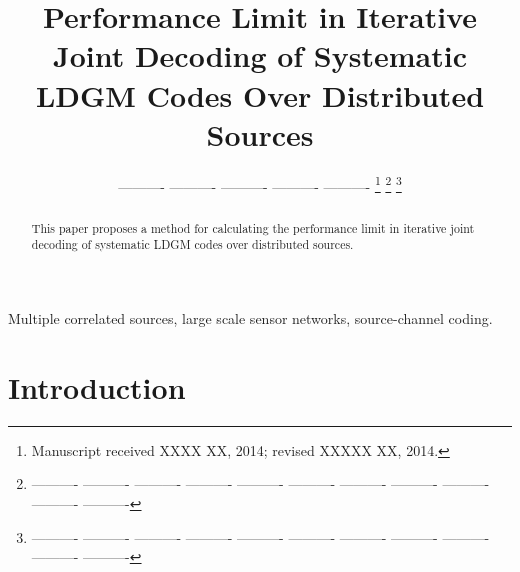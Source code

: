 \documentclass[journal]{IEEEtran}
\begin{document}
\title{Performance  Limit in Iterative Joint Decoding of Systematic LDGM Codes  Over Distributed Sources}




\author{---------- ---------- ---------- ---------- ---------- %
\thanks{Manuscript received XXXX XX, 2014; revised XXXXX XX, 2014.}
\thanks{---------- ---------- ---------- ---------- ---------- ---------- ---------- ---------- ---------- ---------- ---------- }%
\thanks{---------- ---------- ---------- ---------- ---------- ---------- ---------- ---------- ---------- ---------- ---------- }}%


\maketitle


\begin{abstract}
This paper proposes a method for calculating the performance  limit in  iterative 
joint decoding of systematic LDGM codes  over distributed sources.

\end{abstract}

\begin{keywords}
Multiple correlated sources, large scale sensor networks, source-channel coding.
\end{keywords}

\IEEEpeerreviewmaketitle
\section{Introduction}
\label{sec:Intro}
\end{document}
